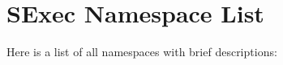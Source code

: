 \section{SExec Namespace List}
Here is a list of all namespaces with brief descriptions:\begin{CompactList}
\item{}
\end{CompactList}
